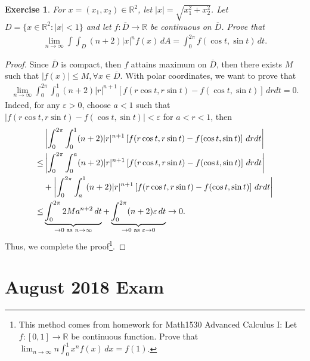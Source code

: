 \documentclass[11pt]{article}
\newtheorem{exercise}{Exercise}[section]
\theoremstyle{definition}
\numberwithin{equation}{subsection}
\begin{document}
\medskip

\begin{exercise}
For $x = (x_1, x_2) \in \mathbb{R}^2$, let $|x| = \sqrt{x_1^2 + x_2^2}$. Let $D = \{x \in \mathbb{R}^2: |x| < 1\}$ and let $f: \overline{D} \to \mathbb{R}$ be continuous on $\overline{D}$. Prove that
\begin{align*}
    \lim_{n\to\infty} \int\int_D (n + 2)|x|^n f(x)\, dA = \int^{2\pi}_0 f(\cos t, \sin t)\, dt.
\end{align*}
\end{exercise}
\begin{proof}
Since $\overline{D}$ is compact, then $f$ attains maximum on $\overline{D}$, then there exists $M$ such that $|f(x)| \leq M, \forall x \in \overline{D}$. With polar coordinates, we want to prove that 
\begin{align*}
    \lim_{n\to\infty} \int^{2\pi}_0 \int^1_0 (n+2) |r|^{n+1} \left[f(r\cos t,r\sin t) - f(\cos t, \sin t) \right] \, dr dt = 0.
\end{align*}
Indeed, for any $\varepsilon > 0$, choose $a < 1$ such that $|f(r\cos t,r\sin t) - f(\cos t, \sin t)| < \varepsilon$ for $a < r < 1$, then 
\begin{align*}
    & \left| \int^{2\pi}_0 \int^1_0 (n+2) |r|^{n+1} \left[f(r\cos t,r\sin t) - f(\cos t, \sin t) \right] \, dr dt \right| \\
    \leq & \left| \int^{2\pi}_0 \int^a_0 (n+2) |r|^{n+1} \left[f(r\cos t,r\sin t) - f(\cos t, \sin t) \right] \, dr dt \right| \\
    & + \left| \int^{2\pi}_0 \int^1_a (n+2) |r|^{n+1} \left[f(r\cos t,r\sin t) - f(\cos t, \sin t) \right] \, dr dt \right| \\
    \leq & \underbrace{\int^{2\pi}_0 2 M a^{n+2} \, dt}_{\to 0\,\,{\rm as}\,\, n \to \infty}  + \underbrace{\int^{2\pi}_0 (n+2) \varepsilon \, dt}_{\to 0\,\,{\rm as}\,\, \varepsilon \to 0} \to 0.
\end{align*}
Thus, we complete the proof\footnote{This method comes from homework for Math1530 Advanced Calculus I: Let $f:[0,1] \to \mathbb{R}$ be continuous function. Prove that $\lim_{n\to\infty} n \int^1_0 x^n f(x)\, dx = f(1)$.}.
\end{proof}

\newpage

\section{August 2018 Exam}
\end{document}
